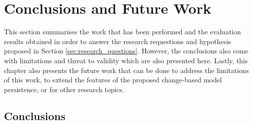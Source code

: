 \chapter{Conclusions and Future Work}
\label{ch:conclusions_and_future_work}

This section summarises the work that has been performed and the evaluation results obtained in order to answer the research requestions and hypothesis proposed in Section \ref{sec:research_questions}. However, the conclusions also come with limitations and threat to validity which are also presented here. Lastly, this chapter also presents the future work that can be done to address the limitations of this work, to extend the features of the proposed change-based model persistence, or for other research topics.

\section{Conclusions}
\label{conclusions_overall}
